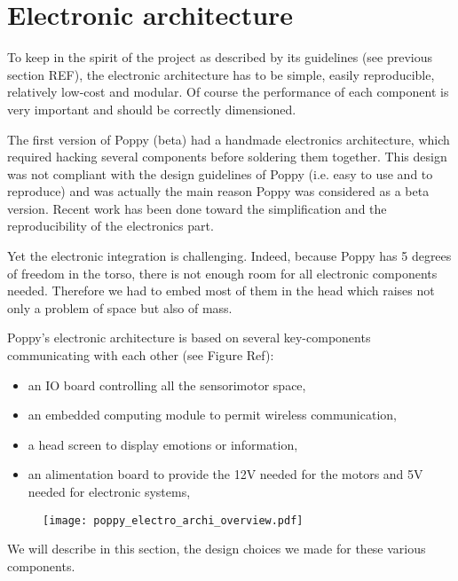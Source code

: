
\section{Electronic architecture} %

To keep in the spirit of the project as described by its guidelines (see previous section REF), the electronic architecture has to be simple, easily reproducible, relatively low-cost and modular. Of course the performance of each component is very important and should be correctly dimensioned.

The first version of Poppy (beta) had a handmade electronics architecture, which required hacking several components before soldering them together. This design was not compliant with the design guidelines of Poppy (i.e. easy to use and to reproduce) and was actually the main reason Poppy was considered as a beta version. Recent work has been done toward the simplification and the reproducibility of the electronics part.

Yet the electronic integration is challenging. Indeed, because Poppy has 5 degrees of freedom in the torso, there is not enough room for all electronic components needed. Therefore we had to embed most of them in the head which raises not only a problem of space but also of mass.


Poppy's electronic architecture is based on several key-components communicating with each other (see Figure Ref):
\begin{itemize}
    \item an IO board controlling all the sensorimotor space,
    \item an embedded computing module to permit wireless communication,
    \item a head screen to display emotions or information,
    \item an alimentation board to provide the 12V needed for the motors and 5V needed for electronic systems,
\end{itemize}

\begin{figure}[tb]
    \begin{center}
        \texttt{[image: poppy\_electro\_archi\_overview.pdf]}
    \end{center}
    \caption{}

\end{figure}

We will describe in this section, the design choices we made for these various components.

